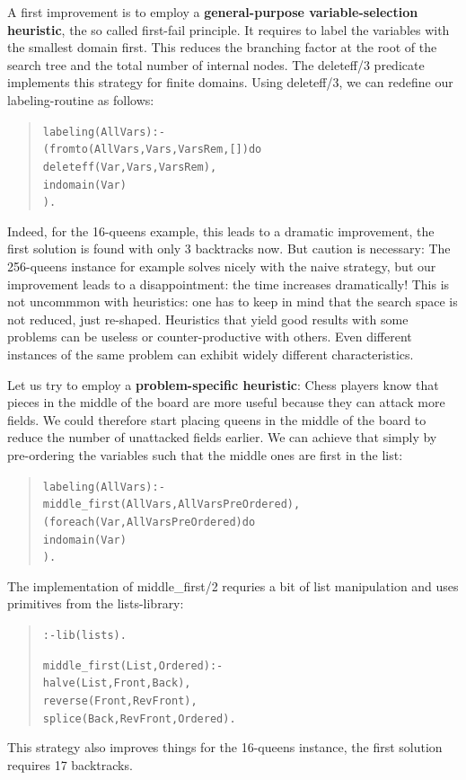 A first improvement is to employ a
{\bf general-purpose variable-selection heuristic},
the so called first-fail principle. It requires to label the
variables with the smallest domain first. This reduces the branching
factor at the root of the search tree and the total number of internal nodes.
The deleteff/3 predicate implements this strategy for finite domains.
Using deleteff/3, we can redefine our labeling-routine as follows:
\begin{quote}\begin{alltt}
labeling(AllVars) :-
        ( fromto(AllVars, Vars, VarsRem, []) do
            deleteff(Var, Vars, VarsRem),       %
            indomain(Var)                       %
        ).
\end{alltt}\end{quote}
Indeed, for the 16-queens example, this leads to a dramatic improvement,
the first solution is found with only 3 backtracks now.
But caution is necessary: The 256-queens instance for example solves
nicely with the naive strategy, but our improvement leads to a
disappointment: the time increases dramatically!
This is not uncommmon with heuristics: one has to keep in mind that the
search space is not reduced, just re-shaped. Heuristics that yield good
results with some problems can be useless or counter-productive with others.
Even different instances of the same problem can exhibit widely different
characteristics.
 
Let us try to employ a {\bf problem-specific heuristic}:
Chess players know that pieces in the middle of the board are more
useful because they can attack more fields. We could therefore start
placing queens in the middle of the board to reduce the number of
unattacked fields earlier. We can achieve that simply by pre-ordering the
variables such that the middle ones are first in the list:
\begin{quote}\begin{alltt}
labeling(AllVars) :-
        middle_first(AllVars, AllVarsPreOrdered), %
        ( foreach(Var, AllVarsPreOrdered) do
            indomain(Var)                       %
        ).
\end{alltt}\end{quote}
The implementation of middle\_first/2 requries a bit of list manipulation
and uses primitives from the lists-library:
\begin{quote}\begin{alltt}
:- lib(lists).

middle_first(List, Ordered) :-
        halve(List, Front, Back),
        reverse(Front, RevFront),
        splice(Back, RevFront, Ordered).
\end{alltt}\end{quote}
This strategy also improves things for the 16-queens instance, the
first solution requires 17 backtracks.


